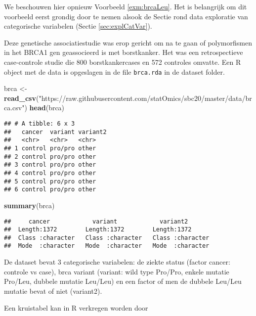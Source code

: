 \documentclass[
  12pt,dutch,coursenotes]{book}
\newenvironment{Shaded}{\begin{snugshade}}{\end{snugshade}}
\newcommand{\KeywordTok}[1]{\textcolor[rgb]{0.13,0.29,0.53}{\textbf{#1}}}
\newcommand{\NormalTok}[1]{#1}
\newcommand{\StringTok}[1]{\textcolor[rgb]{0.31,0.60,0.02}{#1}}
\theoremstyle{definition}
\theoremstyle{definition}
\theoremstyle{definition}
\theoremstyle{remark}
\begin{document}
We beschouwen hier opnieuw Voorbeeld \ref{exm:brcaLeu}.
Het is belangrijk om dit voorbeeld eerst grondig door te nemen alsook de Sectie rond data exploratie van categorische variabelen (Sectie \ref{sec:explCatVar}).

Deze genetische associatiestudie was erop gericht om na te gaan of polymorfismen in het BRCA1 gen geassocieerd is met borstkanker.
Het was een retrospectieve case-controle studie die 800 borstkankercases en 572 controles omvatte.
Een R object met de data is opgeslagen in de file \texttt{brca.rda} in de dataset folder.

\begin{Shaded}
\begin{Highlighting}[]
\NormalTok{brca \textless{}{-}}\StringTok{ }\KeywordTok{read\_csv}\NormalTok{(}\StringTok{"https://raw.githubusercontent.com/statOmics/sbc20/master/data/brca.csv"}\NormalTok{)}
\KeywordTok{head}\NormalTok{(brca)}
\end{Highlighting}
\end{Shaded}

\begin{verbatim}
## # A tibble: 6 x 3
##   cancer  variant variant2
##   <chr>   <chr>   <chr>   
## 1 control pro/pro other   
## 2 control pro/pro other   
## 3 control pro/pro other   
## 4 control pro/pro other   
## 5 control pro/pro other   
## 6 control pro/pro other
\end{verbatim}

\begin{Shaded}
\begin{Highlighting}[]
\KeywordTok{summary}\NormalTok{(brca)}
\end{Highlighting}
\end{Shaded}

\begin{verbatim}
##     cancer            variant            variant2        
##  Length:1372        Length:1372        Length:1372       
##  Class :character   Class :character   Class :character  
##  Mode  :character   Mode  :character   Mode  :character
\end{verbatim}

De dataset bevat 3 categorische variabelen: de ziekte status (factor cancer: controle vs case), brca variant (variant: wild type Pro/Pro, enkele mutatie Pro/Leu, dubbele mutatie Leu/Leu) en een factor of men de dubbele Leu/Leu mutatie bevat of niet (variant2).

Een kruistabel kan in R verkregen worden door
\end{document}
